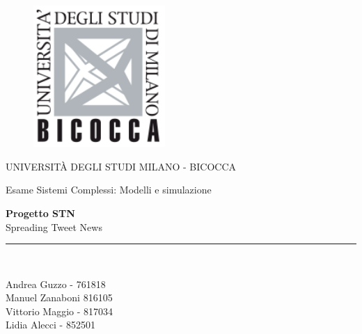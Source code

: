 \documentclass[11pt, english]{article}
\begin{document}
\begin{titlepage}

\begin{center}
\vspace*{-1in}
\begin{figure}[htb]
\begin{center}
\includegraphics[width=5cm]{Resources/BicoccaLogo.png}
\end{center}
\end{figure}
UNIVERSITÀ DEGLI STUDI MILANO - BICOCCA \\
\vspace*{0.4in}
\begin{large}
Esame Sistemi Complessi: Modelli e simulazione\\
\end{large}
\vspace*{0.2in}
\begin{Large}
\textbf{Progetto STN} \\
\vspace*{0.15in}
Spreading Tweet News \\
\end{Large}
\vspace*{0.3in}

\vspace*{0.3in}
\rule{80mm}{0.1mm}\\
\vspace*{0.1in}
\begin{large}

Andrea Guzzo - 761818\\
Manuel Zanaboni 816105\\
Vittorio Maggio - 817034\\
Lidia Alecci - 852501


\end{large}
\end{center}
\end{titlepage}
\end{document}
